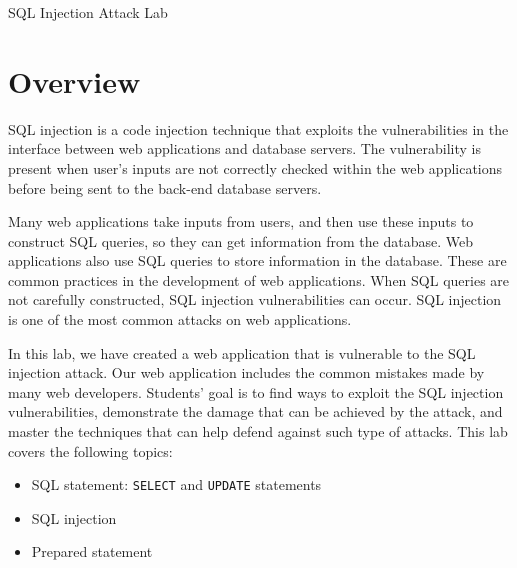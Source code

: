 




\newcommand{\sqlFigs}{./Figs}





\begin{center}
{\LARGE SQL Injection Attack Lab }
\end{center}



\section{Overview}

SQL injection is a code injection technique that exploits the 
vulnerabilities in the interface between web applications and 
database servers. The vulnerability is present when user's inputs 
are not correctly checked within the web applications 
before being sent to the back-end database servers.

Many web applications take inputs from users, and then use these
inputs to construct SQL queries, so they can get information from the database.
Web applications also use SQL queries to store information in
the database. These are common practices in the development of web applications.
When SQL queries are not carefully constructed, 
SQL injection vulnerabilities can occur. 
SQL injection is one of the most common 
attacks on web applications.


In this lab, we have created a web application that is vulnerable to the SQL injection attack. 
Our web application includes the common mistakes made by many web developers. 
Students' goal is to find ways to exploit the SQL injection vulnerabilities,
demonstrate the damage that can be achieved by the attack, 
and master the techniques that can help defend against such type of attacks.
This lab covers the following topics:

\begin{itemize}[noitemsep]
\item SQL statement: \texttt{SELECT} and \texttt{UPDATE} statements
\item SQL injection
\item Prepared statement
\end{itemize}



